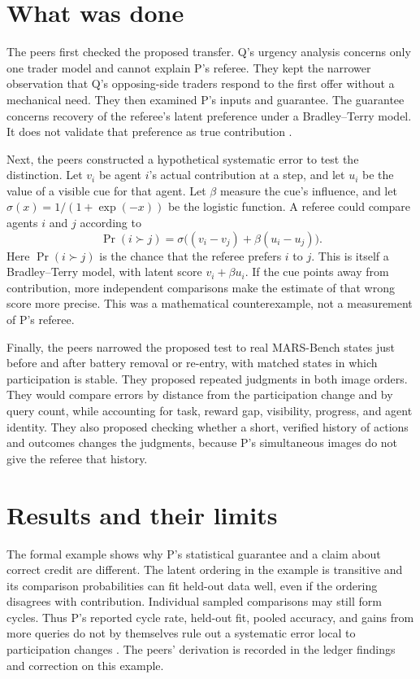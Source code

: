 \documentclass{article}
\begin{document}
\section{What was done}

The peers first checked the proposed transfer. Q's urgency analysis concerns only one trader model and cannot explain P's referee. They kept the narrower observation that Q's opposing-side traders respond to the first offer without a mechanical need. They then examined P's inputs and guarantee. The guarantee concerns recovery of the referee's latent preference under a Bradley--Terry model. It does not validate that preference as true contribution \cite{Q,P}.

Next, the peers constructed a hypothetical systematic error to test the distinction. Let \(v_i\) be agent \(i\)'s actual contribution at a step, and let \(u_i\) be the value of a visible cue for that agent. Let \(\beta\) measure the cue's influence, and let \(\sigma(x)=1/(1+\exp(-x))\) be the logistic function. A referee could compare agents \(i\) and \(j\) according to
\[
\Pr(i\succ j)=\sigma\bigl((v_i-v_j)+\beta(u_i-u_j)\bigr).
\]
Here \(\Pr(i\succ j)\) is the chance that the referee prefers \(i\) to \(j\). This is itself a Bradley--Terry model, with latent score \(v_i+\beta u_i\). If the cue points away from contribution, more independent comparisons make the estimate of that wrong score more precise. This was a mathematical counterexample, not a measurement of P's referee.

Finally, the peers narrowed the proposed test to real MARS-Bench states just before and after battery removal or re-entry, with matched states in which participation is stable. They proposed repeated judgments in both image orders. They would compare errors by distance from the participation change and by query count, while accounting for task, reward gap, visibility, progress, and agent identity. They also proposed checking whether a short, verified history of actions and outcomes changes the judgments, because P's simultaneous images do not give the referee that history.

\section{Results and their limits}

The formal example shows why P's statistical guarantee and a claim about correct credit are different. The latent ordering in the example is transitive and its comparison probabilities can fit held-out data well, even if the ordering disagrees with contribution. Individual sampled comparisons may still form cycles. Thus P's reported cycle rate, held-out fit, pooled accuracy, and gains from more queries do not by themselves rule out a systematic error local to participation changes \cite{P}. The peers' derivation is recorded in the ledger findings and correction on this example.
\end{document}
